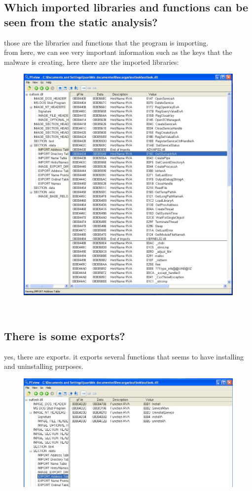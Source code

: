 \documentclass[12pt,letter]{article} %
\begin{document}
        \subsection{Which imported libraries and functions can be seen from the static analysis?}
            those are the libraries and functions that the program is importing.
            \\
            from here, we can see very important information such as the keys
            that the malware is creating, here there are the imported
            libraries:
            \begin{figure}[h!]
            	\centering
            \includegraphics[width=0.5\linewidth]{imports2.jpeg}
            \end{figure}
		$ $\\
		\pagebreak
        \subsection{There is some exports?}
            yes, there are exports. it exports several functions  that seems to
            have installing and uninstalling purposes.

            \begin{figure}[h!]
        	    \includegraphics[width=0.8\linewidth]{exports1.jpeg}
            \end{figure}
			 \pagebreak
\end{document}

